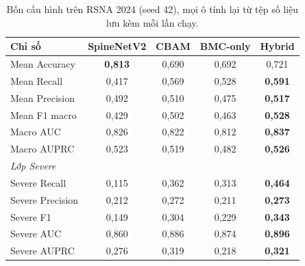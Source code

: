 \documentclass[11pt,a4paper]{article}
\begin{document}
\begin{table}[htbp]\centering\small
\caption{Bốn cấu hình trên RSNA 2024 (seed 42), mọi ô tính lại từ tệp số liệu lưu kèm mỗi lần chạy.}
\label{tab:phase2}
\begin{tabular}{lcccc}\toprule
\textbf{Chỉ số} & \textbf{SpineNetV2} & \textbf{CBAM} & \textbf{BMC-only} & \textbf{Hybrid} \\\midrule
Mean Accuracy & \textbf{0{,}813} & 0{,}690 & 0{,}692 & 0{,}721 \\
Mean Recall & 0{,}417 & 0{,}569 & 0{,}528 & \textbf{0{,}591} \\
Mean Precision & 0{,}492 & 0{,}510 & 0{,}475 & \textbf{0{,}517} \\
Mean F1 macro & 0{,}429 & 0{,}502 & 0{,}463 & \textbf{0{,}528} \\
Macro AUC & 0{,}826 & 0{,}822 & 0{,}812 & \textbf{0{,}837} \\
Macro AUPRC & 0{,}523 & 0{,}519 & 0{,}482 & \textbf{0{,}526} \\
\midrule\multicolumn{5}{l}{\textit{Lớp Severe}} \\
Severe Recall & 0{,}115 & 0{,}362 & 0{,}313 & \textbf{0{,}464} \\
Severe Precision & 0{,}212 & 0{,}272 & 0{,}211 & \textbf{0{,}273} \\
Severe F1 & 0{,}149 & 0{,}304 & 0{,}229 & \textbf{0{,}343} \\
Severe AUC & 0{,}860 & 0{,}886 & 0{,}874 & \textbf{0{,}896} \\
Severe AUPRC & 0{,}276 & 0{,}319 & 0{,}218 & \textbf{0{,}321} \\
\bottomrule\end{tabular}\end{table}
\end{document}
